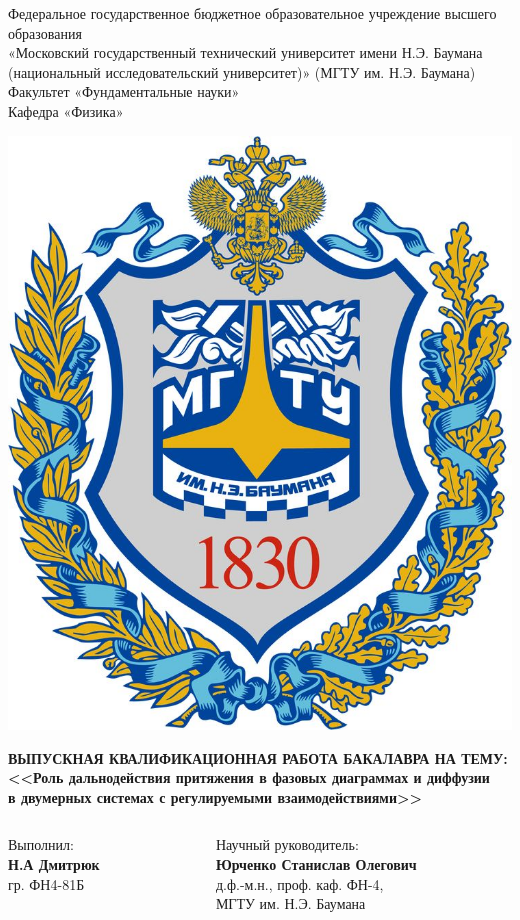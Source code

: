 \documentclass[pdf,hyperref={unicode}]{beamer}
\date{ }
\begin{document}

\begin{frame}
	\begin{center}\tiny
		Федеральное государственное бюджетное образовательное учреждение высшего образования \\ «Московский государственный технический университет имени Н.Э. Баумана (национальный исследовательский университет)» (МГТУ им. Н.Э. Баумана)\\
		Факультет «Фундаментальные науки»\\
		Кафедра «Физика»\\
    \end{center}

	\begin{center}
		\includegraphics[width=0.15\linewidth]{emb}
	\end{center}

	\begin{center}
\tiny \textbf{ВЫПУСКНАЯ КВАЛИФИКАЦИОННАЯ РАБОТА БАКАЛАВРА НА ТЕМУ:}\\
\vspace{0.1cm}
\tiny \textbf{<<Роль дальнодействия притяжения в фазовых диаграммах и диффузии\\ в двумерных системах с регулируемыми взаимодействиями>>}
\end{center}

	\vspace{0.3cm}
	
	\begin{columns}
        \begin{column}{0.50\textwidth}
        \begin{center}
            \tiny Выполнил: \\
        \vspace{0.1cm}
        \tiny \textbf{Н.А Дмитрюк}\\
        \tiny гр. ФН4-81Б \\
        \vspace{0.2cm}
         \end{center}
        \end{column}
       
        
        \begin{column}{0.50\textwidth}
        \begin{center}
            \tiny Научный руководитель:\\
        \vspace{0.1cm}
        \tiny \textbf{Юрченко Станислав Олегович} \\
        \tiny д.ф.-м.н., проф. каф. ФН-4,\\
        \tiny МГТУ им. Н.Э. Баумана \\
        \end{center}
                        

\end{column}
\end{columns}
\end{frame}
\end{document}
